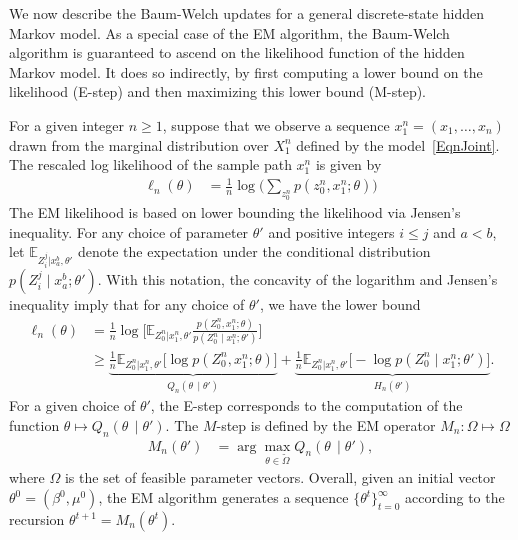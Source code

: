 \documentclass[twoside,11pt]{article}
\newcommand{\numobs}{\ensuremath{n}}
\def\EE{ \mathbb{E} }
\newcommand{\EEzcondx}[3]{\ensuremath{\EE_{#1|#2,#3}}}
\newcommand{\paramobs}{\mu}
\newcommand{\paramtrans}{\beta}
\newcommand{\paramjoint}{\theta}
\newcommand{\paramtransit}[1]{\ensuremath{\paramtrans^{#1}}}
\newcommand{\paramobsit}[1]{\ensuremath{\paramobs^{#1}}}
\newcommand{\paramjointit}[1]{\ensuremath{\theta^{#1}}}
\newcommand{\MFUNSAM}{\ensuremath{M_\numobs}}
\newcommand{\LikeSample}{\ensuremath{\ell_\numobs}}
\newcommand{\hprob}{\ensuremath{p}}
\newcommand{\QFUNSAM}[2]{\ensuremath{Q_\numobs (#1 \, \mid #2)}}
\newcommand{\DomTheta}{\ensuremath{\Omega}}
\newcommand{\DomThetaFeas}{\widetilde{\DomTheta}}
\begin{document}
We now describe the Baum-Welch updates for a general discrete-state
hidden Markov model.  As a special case of the EM algorithm, the
Baum-Welch algorithm is guaranteed to ascend on the likelihood
function of the hidden Markov model.  It does so indirectly, by first
computing a lower bound on the likelihood (E-step) and then maximizing
this lower bound (M-step).


For a given integer $\numobs \geq 1$, suppose that we observe a
sequence $x_1^\numobs = (x_1, \ldots, x_\numobs)$ drawn from the
marginal distribution over $X_1^\numobs$ defined by the
model~\eqref{EqnJoint}. The rescaled log likelihood of the sample path
$x_1^\numobs$ is given by
\begin{align*}
\LikeSample(\paramjoint) & = \frac{1}{\numobs} \log
\Big(\sum_{z_0^\numobs} \hprob(z_0^\numobs, x_1^\numobs; \paramjoint)
\Big)
\end{align*}
The EM likelihood is based on lower bounding the likelihood via
Jensen's inequality.  For any choice of parameter $\paramjoint'$ and
positive integers $i\leq j$ and $a<b$, let
$\EEzcondx{Z_i^{j}}{x_a^b}{\paramjoint'}$ denote the expectation under
the conditional distribution $p(Z_i^j \mid x_a^b; \paramjoint')$.
With this notation, the concavity of the logarithm and Jensen's
inequality imply that for any choice of $\paramjoint'$, we have the
lower bound
\begin{align*}
\LikeSample(\paramjoint) &= \frac{1}{\numobs} \log \big[
  \EEzcondx{Z_0^{\numobs}}{x_1^{\numobs}}{\paramjoint'}
  \frac{p(Z_0^{\numobs}, x_1^{\numobs}; \paramjoint)}{p(Z_0^{\numobs}
    \mid x_1^{\numobs}; \paramjoint') } \big] \\
%
& \geq \underbrace{\frac{1}{\numobs}
  \EEzcondx{Z_0^{\numobs}}{x_1^\numobs}{\paramjoint'} \big[ \log
    p(Z_0^\numobs,x_1^\numobs; \paramjoint)
    \big]}_{\QFUNSAM{\paramjoint}{\paramjoint'}} +
\underbrace{\frac{1}{\numobs}
  \EEzcondx{Z_0^{\numobs}}{x_1^\numobs}{\paramjoint'} \big[ -\log
    p(Z_0^\numobs \mid x_1^\numobs;
    \paramjoint')]}_{H_\numobs(\paramjoint')}.
\end{align*}
For a given choice of $\paramjoint'$, the E-step corresponds to the
computation of the function \mbox{$\paramjoint \mapsto
  \QFUNSAM{\paramjoint}{\paramjoint'}$.}  The $M$-step is defined by
the EM operator $\MFUNSAM: \DomTheta \mapsto \DomTheta$
\begin{align}
\label{EqnEMOperator}
\MFUNSAM(\paramjoint') & = \arg \max_{\theta \in \DomThetaFeas}
\QFUNSAM{\paramjoint}{\paramjoint'},
\end{align}
where $\DomTheta$ is the set of feasible parameter vectors.  Overall,
given an initial vector $\paramjointit{0} = (\paramtransit{0},
\paramobsit{0})$, the EM algorithm generates a sequence
$\{\paramjointit{t}\}_{t=0}^\infty$ according to the recursion
$\paramjointit{t+1} = \MFUNSAM(\paramjointit{t})$.
\end{document}
